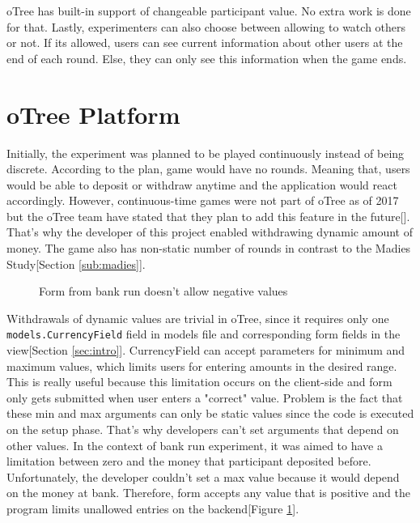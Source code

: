oTree has built-in support of changeable participant value. No extra work is done for that. Lastly, experimenters can also choose between allowing to watch others or not. If its allowed, users can see current information about other users at the end of each round. Else, they can only see this information when the game ends.

\section{oTree Platform}

Initially, the experiment was planned to be played continuously instead of being discrete. According to the plan, game would have no rounds. Meaning that, users would be able to deposit or withdraw anytime and the application would react accordingly. However, continuous-time games were not part of oTree as of 2017 but the oTree team have stated that they plan to add this feature in the future[\cite{oTreeSlides2007}]. That's why the developer of this project enabled withdrawing dynamic amount of money. The game also has non-static number of rounds in contrast to the Madies Study[Section \ref{sub:madies}].

\begin{figure}[h]
	\centerline{}
	\caption{Form from bank run doesn't allow negative values }
	\label{tab:tabellenreferenz11}
	
\end{figure}

Withdrawals of dynamic values are trivial in oTree, since it requires only one \verb|models.CurrencyField| field in models file and corresponding form fields in the view[Section \ref{sec:intro}]. CurrencyField can accept parameters for minimum and maximum values, which limits users for entering amounts in the desired range. This is really useful because this limitation occurs on the client-side and form only gets submitted when user enters a "correct" value. Problem is the fact that these min and max arguments can only be static values since the code is executed on the setup phase. That's why developers can't set arguments that depend on other values. In the context of  bank run experiment, it was aimed to have a limitation between zero and the money that participant deposited before. Unfortunately, the developer couldn't set a max value because it would depend on the money at bank. Therefore, form accepts any value that is positive and the program limits unallowed entries on the backend[Figure \ref{tab:tabellenreferenz11}]. 

